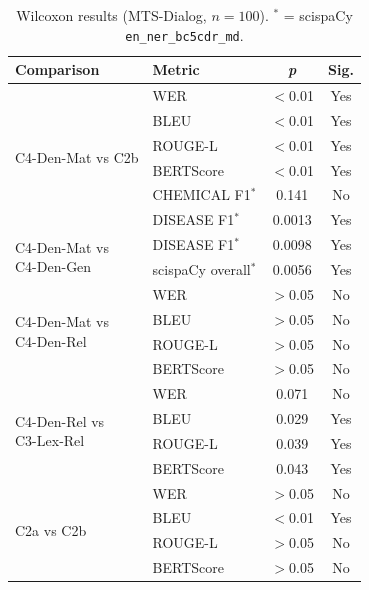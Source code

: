 \documentclass[11pt,a4paper,twocolumn]{article}
\begin{document}
\begin{table}[!t]
\centering
\caption{Wilcoxon results (MTS-Dialog, $n{=}100$). $^\ast$ = scispaCy
\texttt{en\_ner\_bc5cdr\_md}.}
\label{tab:mts_wilcoxon}
\footnotesize
\setlength{\tabcolsep}{3.5pt}
\renewcommand{\arraystretch}{1.1}
\begin{tabular}{p{2.4cm}lcc}
\toprule
\textbf{Comparison} & \textbf{Metric} & \textbf{\textit{p}} & \textbf{Sig.} \\
\midrule
\multirow{6}{*}{C4-Den-Mat vs C2b}
  & WER                     & \cellcolor{siggreen}$<$0.01  & Yes \\
  & BLEU                    & \cellcolor{siggreen}$<$0.01  & Yes \\
  & ROUGE-L                 & \cellcolor{siggreen}$<$0.01  & Yes \\
  & BERTScore               & \cellcolor{siggreen}$<$0.01  & Yes \\
  & CHEMICAL F1$^\ast$      & \cellcolor{sigunsig}0.141    & No  \\
  & DISEASE F1$^\ast$       & \cellcolor{siggreen}0.0013   & Yes \\
\midrule
\multirow{2}{*}{\parbox{2.4cm}{C4-Den-Mat vs\\C4-Den-Gen}}
  & DISEASE F1$^\ast$       & \cellcolor{siggreen}0.0098   & Yes \\
  & scispaCy overall$^\ast$ & \cellcolor{siggreen}0.0056   & Yes \\
\midrule
\multirow{4}{*}{\parbox{2.4cm}{C4-Den-Mat vs\\C4-Den-Rel}}
  & WER       & \cellcolor{sigunsig}$>$0.05 & No \\
  & BLEU      & \cellcolor{sigunsig}$>$0.05 & No \\
  & ROUGE-L   & \cellcolor{sigunsig}$>$0.05 & No \\
  & BERTScore & \cellcolor{sigunsig}$>$0.05 & No \\
\midrule
\multirow{4}{*}{\parbox{2.4cm}{C4-Den-Rel vs\\C3-Lex-Rel}}
  & WER       & \cellcolor{sigunsig}0.071  & No  \\
  & BLEU      & \cellcolor{siggreen}0.029  & Yes \\
  & ROUGE-L   & \cellcolor{siggreen}0.039  & Yes \\
  & BERTScore & \cellcolor{siggreen}0.043  & Yes \\
\midrule
\multirow{4}{*}{C2a vs C2b}
  & WER       & \cellcolor{sigunsig}$>$0.05 & No  \\
  & BLEU      & \cellcolor{siggreen}$<$0.01 & Yes \\
  & ROUGE-L   & \cellcolor{sigunsig}$>$0.05 & No  \\
  & BERTScore & \cellcolor{sigunsig}$>$0.05 & No  \\
\bottomrule
\end{tabular}
\end{table}
\end{document}
